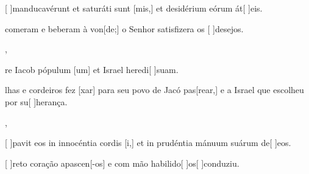 {  {\item {}[ ]{man}ducavérunt et saturáti sunt [mis,] et desidérium eórum át[ ]{e}is.~\Antiphona}%
    {\item {} comeram e beberam à von[de;] o Senhor satisfizera os [ ]{de}{se}jos.~\Antiphona},
  {\item {}re Iacob pópulum [um] et Israel heredi[ ]{su}am.~\Antiphona}%
    {\item {}lhas e cordeiros fez [xar] para seu povo de Jacó pas[rear,] e a Israel que escolheu por su[ ]{he}{ran}ça.~\Antiphona},
  {\item {}[ ]{pa}vit eos in innocéntia cordis [i,] et in prudéntia mánuum suárum de[ ]{e}os.~\Antiphona}%
    {\item {}[ ]{re}to coração apascen[-os] e com mão habilido[ ]{os}[ ]{con}duziu.~\Antiphona}
}